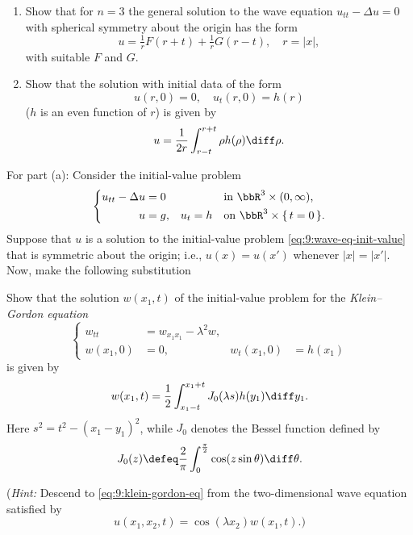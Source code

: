 \begin{problem}
  \begin{enumerate}[label=(\alph*),noitemsep]
  \item Show that for \(n=3\) the general solution to the wave equation
    \(u_{tt}-\Delta u=0\) with spherical symmetry about the origin has the
    form
    \[
      u=\tfrac{1}{r}F(r+t)+\tfrac{1}{r}G(r-t),\quad r=|x|,
    \]
    with suitable \(F\) and \(G\).
  \item Show that the solution with initial data of the form
    \[
      u(r,0)=0,\quad u_t(r,0)=h(r)
    \]
    (\(h\) is an even function of \(r\)) is given by
    \[
      u=\frac{1}{2r}\int_{r-t}^{r+t} \rho h(\rho)\diff \rho.
    \]
  \end{enumerate}
\end{problem}
\begin{solution}
  For part (a): Consider the initial-value problem
  \begin{equation}
    \label{eq:9:wave-eq-init-value}
    \left\{
      \begin{aligned}
        u_{tt}-\Delta u&=0&&&&\text{in \(\bbR^3\times(0,\infty)\),}\\
        u&=g,&u_t&=h&&\text{on \(\bbR^3\times\{\,t=0\,\}\).}
      \end{aligned}
    \right.
  \end{equation}
  Suppose that \(u\) is a solution to the initial-value problem
  \eqref{eq:9:wave-eq-init-value} that is symmetric about the origin; i.e.,
  \(u(x)=u(x')\) whenever \(|x|=|x'|\). Now, make the following substitution
\end{solution}
\newpage

\begin{problem}
  Show that the solution \(w(x_1,t)\) of the initial-value problem for the
  \emph{Klein--Gordon equation}
  \begin{equation}
    \label{eq:9:klein-gordon-eq}
    \left\{
      \begin{aligned}
        w_{tt}&=w_{x_1x_1}-\lambda^2w,\\
        w(x_1,0)&=0,&w_t(x_1,0)&=h(x_1)
      \end{aligned}
    \right.
  \end{equation}
  is given by
  \[
    w(x_1,t)=\frac{1}{2}\int_{x_1-t}^{x_1+t}J_0(\lambda s) h(y_1)\diff y_1.
  \]
  Here \(s^2=t^2-(x_1-y_1)^2\), while \(J_0\) denotes the Bessel function
  defined by
  \[
    J_0(z)\defeq \frac{2}{\pi}\int_0^{\frac{\pi}{2}}\cos(z\sin\theta)\diff\theta.
  \]

  \noindent (\emph{Hint:} Descend to \eqref{eq:9:klein-gordon-eq} from the
  two-dimensional wave equation satisfied by
  \[
    u(x_1,x_2,t)=\cos(\lambda x_2)w(x_1,t).\text{)}
  \]
\end{problem}
\begin{solution}
\end{solution}
\newpage

